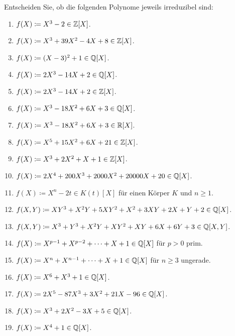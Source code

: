 \begin{question}[subtitle = Irreduziblität von Polynomen]
  Entscheiden Sie, ob die folgenden Polynome jeweils irreduzibel sind:
  \begin{enumerate}
    \item
      $f(X) \coloneqq X^3 - 2 \in \mathbb{Z}[X]$.
    \item
      $f(X) \coloneqq X^3 + 39 X^2 - 4X + 8 \in \mathbb{Z}[X]$.
    \item
      $f(X) \coloneqq (X - 3)^2 + 1 \in \mathbb{Q}[X]$.
    \item
      $f(X) \coloneqq 2X^3 - 14X + 2 \in \mathbb{Q}[X]$.
    \item
      $f(X) \coloneqq 2X^3 - 14X + 2 \in \mathbb{Z}[X]$.
    \item
      $f(X) \coloneqq X^3 - 18 X^2 + 6 X + 3 \in \mathbb{Q}[X]$.
    \item
      $f(X) \coloneqq X^3 - 18 X^2 + 6 X + 3 \in \mathbb{R}[X]$.
    \item
      $f(X) \coloneqq X^5 + 15 X^2 + 6 X + 21 \in \mathbb{Z}[X]$.
    \item
      $f(X) \coloneqq X^3 + 2 X^2 + X + 1 \in \mathbb{Z}[X]$.
    \item
      $f(X) \coloneqq 2X^4 + 200 X^3 + 2000 X^2 + 20000 X + 20 \in \mathbb{Q}[X]$.
    \item
      $f(X) \coloneqq  X^n - 2t \in K(t)[X]$ für einen Körper $K$ und $n \geq 1$.
    \item
      $f(X,Y) \coloneqq X Y^3 + X^2 Y + 5 X Y^2 + X^2 + 3 X Y + 2 X + Y + 2 \in \mathbb{Q}[X]$.
    \item
      $f(X,Y) \coloneqq X^3 + Y^3 + X^2 Y + X Y^2 + XY + 6 X + 6 Y + 3 \in \mathbb{Q}[X,Y]$.
    \item
      $f(X) \coloneqq X^{p-1} + X^{p-2} + \dotsb + X + 1 \in \mathbb{Q}[X]$ für $p > 0$ prim.
    \item
      $f(X) \coloneqq X^n + X^{n-1} + \dotsb + X + 1 \in \mathbb{Q}[X]$ für $n \geq 3$ ungerade.
    \item
      $f(X) \coloneqq X^6 + X^3 + 1 \in \mathbb{Q}[X]$.
    \item
      $f(X) \coloneqq 2 X^5  - 87 X^3 + 3 X^2 + 21 X - 96 \in \mathbb{Q}[X]$.
    \item
      $f(X) \coloneqq X^3 + 2 X^2 - 3 X + 5 \in \mathbb{Q}[X]$.
    \item
      $f(X) \coloneqq X^4 + 1 \in \mathbb{Q}[X]$.
  \end{enumerate}
\end{question}


